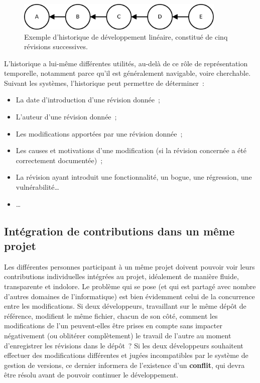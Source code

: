\begin{figure}[h!]
  \includegraphics[width=10cm]{figures/historiqueLineaire}
  \caption{Exemple d'historique de développement linéaire, constitué
    de cinq révisions successives.\label{fig:historiqueLineaire}}
\end{figure}


L'historique a lui-même différentes utilités, au-delà de ce rôle de
représentation temporelle, notamment parce qu'il est généralement
navigable, voire cherchable. Suivant les systèmes, l'historique peut
permettre de déterminer~:
\begin{itemize}
\item La date d'introduction d'une révision donnée~;
\item L'auteur d'une révision donnée~;
\item Les modifications apportées par une révision donnée~;
\item Les causes et motivations d'une modification (si la révision
  concernée a été correctement documentée)~;
\item La révision ayant introduit une fonctionnalité, un
  bogue, une régression, une
  vulnérabilité\ldots
\item \ldots
\end{itemize}

\subsection{Intégration de contributions dans un même projet}

Les différentes personnes participant à un même projet doivent pouvoir
voir leurs contributions individuelles intégrées au projet, idéalement
de manière fluide, transparente et indolore. Le problème qui se pose
(et qui est partagé avec nombre d'autres domaines de l'informatique)
est bien évidemment celui de la concurrence entre les
modifications. Si deux développeurs, travaillant sur le même dépôt de
référence, modifient le même fichier, chacun de son côté, comment les
modifications de l'un peuvent-elles être prises en compte sans
impacter négativement (ou oblitérer complètement) le travail de
l'autre au moment d'enregistrer les révisions dans le dépôt~? Si les
deux développeurs souhaitent effectuer des modifications différentes
et jugées incompatibles par le système de gestion de versions, ce
dernier informera de l'existence d'un \textbf{conflit},
qui devra être résolu avant de pouvoir continuer le développement.

